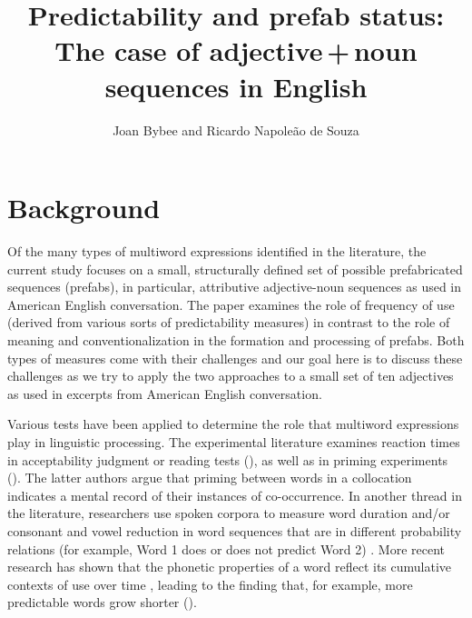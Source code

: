 \documentclass[output=paper]{langscibook}
\author{Joan Bybee\affiliation{University of New Mexico} and Ricardo Napoleão de Souza\affiliation{University of Helsinki}}
\title[Predictability and prefab status: The case of adjective\,+\,noun sequences]{Predictability and prefab status: The case of adjective\,+\,noun sequences in English}
\begin{document}
\maketitle 

\section{Background}

Of the many types of multiword expressions identified in the literature, the current study focuses on a small, structurally defined set of possible prefabricated sequences (prefabs), in particular, attributive adjective-noun sequences as used in American English conversation. The paper examines the role of frequency of use (derived from various sorts of predictability measures) in contrast to the role of meaning and conventionalization in the formation and processing of prefabs. Both types of measures come with their challenges and our goal here is to discuss these challenges as we try to apply the two approaches to a small set of ten adjectives as used in excerpts from American English conversation. 

Various tests have been applied to determine the role that multiword expressions play in linguistic processing. The experimental literature examines reaction times in acceptability judgment or reading tests (\citealt{EllisEtAl2008,GyllstadWolter2016,WolterYamashita2018}), as well as in priming experiments (\citealt{DurrantDoherty2010}). The latter authors argue that priming between words in a collocation indicates a mental record of their instances of co-occurrence. In another thread in the literature, researchers use spoken corpora to measure word duration and\slash or consonant and vowel reduction in word sequences that are in different probability relations (for example, Word 1 does or does not predict Word 2) \citep{BellJurafsky2009}. More recent research has shown that the phonetic properties of a word reflect its cumulative contexts of use over time \citep{Seyfarth2014}, leading to the finding that, for example, more predictable words grow shorter (\citealt{SóskuthyHay2017}).
\end{document}
